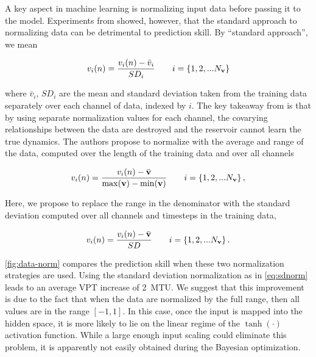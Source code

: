A key aspect in machine learning is normalizing input data before passing it to
the model.
Experiments from \citet{platt_systematic_2022} showed, however, that the
standard approach to normalizing data
can be detrimental to prediction skill.
By ``standard  approach'', we mean
\begin{linenomath*}\begin{equation*}
    v_i(n) = \dfrac{v_i(n) - \bar{v}_i}{SD_i} \qquad
    i = \{1, 2, ... N_{\mathbf{v}}\}
\end{equation*}\end{linenomath*}
where $\bar{v}_i$, $SD_i$ are the mean and standard deviation taken from the
training data separately over each channel of data, indexed by $i$.
The key takeaway from \citet{platt_systematic_2022} is that by using separate
normalization values for each channel, the covarying relationships between the
data are destroyed and the reservoir cannot learn the true dynamics.
The authors propose to normalize with the average and range of the data,
computed over the length of the training data and over all channels
\begin{linenomath*}\begin{equation}
    v_i(n) = \dfrac{v_i(n) - \bar{\mathbf{v}}}{\max(\mathbf{v}) -
    \min(\mathbf{v})}
    \qquad i = \{1,2, ... N_{\mathbf{v}}\} \, ,
    \label{eq:maxmin}
\end{equation}\end{linenomath*}
Here, we propose to replace the range in the denominator with the
standard deviation computed over all channels and timesteps in the training
data,
\begin{linenomath*}\begin{equation}
    v_i(n) = \dfrac{v_i(n) - \bar{\mathbf{v}}}{SD}
    \qquad i = \{1,2, ... N_{\mathbf{v}}\} \, .
    \label{eq:sdnorm}
\end{equation}\end{linenomath*}

\cref{fig:data-norm} compares the prediction skill when these two normalization
strategies are used.
Using the standard deviation normalization as in \cref{eq:sdnorm} leads to an
average VPT increase of 2~MTU.
We suggest that this improvement is due to the fact that when the data are
normalized by the full range, then all values are in the range $[-1,1]$.
In this case, once the input is mapped into the hidden space, it is more likely
to lie on the linear regime of the $\tanh(\cdot)$ activation function.
While a large enough input scaling could eliminate this problem, it is
apparently not easily obtained during the Bayesian optimization.

